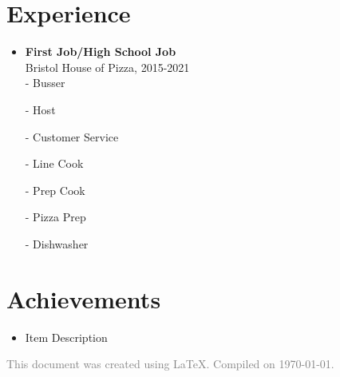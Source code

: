 \documentclass[11pt]{article}
\begin{document}
\section*{Experience}
\vspace{-0.1in}
\begin{itemize}[leftmargin=*]
    \item \textbf{First Job/High School Job} \\
    Bristol House of Pizza, 2015-2021 \\
    - Busser
    
    - Host
    
    - Customer Service
    
    - Line Cook
    
    - Prep Cook
    
    - Pizza Prep
    
    - Dishwasher
\end{itemize}

\section*{Achievements}
\vspace{-0.1in}
\begin{itemize}[leftmargin=*]
    \item Item Description
\end{itemize}

\vspace{0.2in}
\begin{center}
\footnotesize
\textcolor{gray}{This document was created using \LaTeX. Compiled on \today.}
\end{center}
\end{document}

